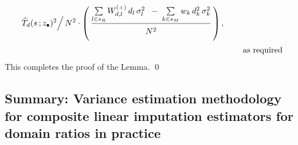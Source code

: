 \begin{enumerate}
\begin{eqnarray*}
{{                \left. \widehat{T}_{d}(s\,;\zdot)^{2} \right\slash N^{2}
                }
            }
        \cdot
        \left(\,
            \dfrac{
                \underset{l \in s_{R}}{\sum}\,
                W^{(+)}_{d,l}\,d_{l}\,\sigma_{l}^{2}
                \;\;-\;
                \underset{k \in s_{M}}{\sum}\,
                w_{k}\,d_{k}^{2}\,\sigma_{k}^{2}
                }{
                \overset{{\color{white}.}}{N^{2}}                
                }
            \,\right),
    \\
    &&
        \quad
        \overset{{\color{white}.}}{\textnormal{
            as required
            }}
    \end{eqnarray*}
    \vskip 0.1cm
    \noindent
    This completes the proof of the Lemma.
    \qed
\end{enumerate}


\clearpage
\subsection{Summary: Variance estimation methodology for composite linear imputation estimators for {\color{red}domain ratios} in practice}
\setcounter{theorem}{0}


